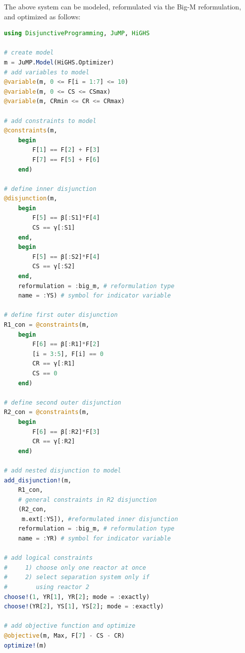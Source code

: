 \documentclass{juliacon}
\begin{document}
\pagebreak
The above system can be modeled, reformulated via the Big-M reformulation, and optimized as follows:
\begin{lstlisting}[language = Julia]
using DisjunctiveProgramming, JuMP, HiGHS

# create model
m = JuMP.Model(HiGHS.Optimizer)
# add variables to model
@variable(m, 0 <= F[i = 1:7] <= 10)
@variable(m, 0 <= CS <= CSmax)
@variable(m, CRmin <= CR <= CRmax)

# add constraints to model
@constraints(m,
    begin
        F[1] == F[2] + F[3]
        F[7] == F[5] + F[6]
    end)

# define inner disjunction
@disjunction(m,
    begin
        F[5] == β[:S1]*F[4]
        CS == γ[:S1]
    end,
    begin
        F[5] == β[:S2]*F[4]
        CS == γ[:S2]
    end,
    reformulation = :big_m, # reformulation type
    name = :YS) # symbol for indicator variable
    
# define first outer disjunction
R1_con = @constraints(m,
    begin
        F[6] == β[:R1]*F[2]
        [i = 3:5], F[i] == 0
        CR == γ[:R1]
        CS == 0
    end)

# define second outer disjunction
R2_con = @constraints(m,
    begin
        F[6] == β[:R2]*F[3]
        CR == γ[:R2]      
    end)

# add nested disjunction to model
add_disjunction!(m,
    R1_con,
    # general constraints in R2 disjunction
    (R2_con,
     m.ext[:YS]), #reformulated inner disjunction
    reformulation = :big_m, # reformulation type
    name = :YR) # symbol for indicator variable

# add logical constraints
#     1) choose only one reactor at once
#     2) select separation system only if
#        using reactor 2
choose!(1, YR[1], YR[2]; mode = :exactly)
choose!(YR[2], YS[1], YS[2]; mode = :exactly)

# add objective function and optimize
@objective(m, Max, F[7] - CS - CR)
optimize!(m)
\end{lstlisting}
\end{document}
